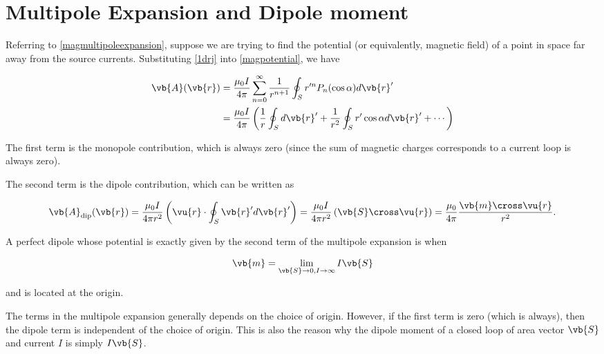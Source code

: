 \documentclass[english,a4paper,12pt]{report}
\begin{document}
\section{Multipole Expansion and Dipole moment}

Referring to \cref{magmultipoleexpansion}, suppose we are trying to find the potential (or equivalently, magnetic field) of a point in space far away from the source currents. Substituting \cref{1drj} into \cref{magpotential}, we have 


\begin{equation}
    \begin{aligned} 
    \vb{A} (\vb{r} ) &= \frac{\mu_0I}{4\pi}  \sum_{n=0}^{\infty} \frac{1}{r^{n+1} } \oint_{S} r'^{n} P_{n}(\cos \alpha )d\vb{r} ' \\
    &= \frac{\mu_0I}{4\pi}  \left( \frac{1}{r} \oint_{S}  d\vb{r}' + \frac{1}{r^2}\oint_{S}  r'\cos \alpha d\vb{r}' + \cdots  \right) 
    \end{aligned} 
\end{equation}

The first term is the monopole contribution, which is always zero (since the sum of magnetic charges corresponds to a current loop is always zero).

The second term is the dipole contribution, which can be written as 

\begin{equation}
    \vb{A} _{\text{dip} } (\vb{r} ) = \frac{\mu_0I}{4\pi r^2}  \left( \vu{r}  \cdot \oint_{S} \vb{r} ' d\vb{r}'  \right) = \frac{\mu_0I}{4\pi r^2} \left( \vb{S} \cross \vu{r} \right) = \frac{\mu_0}{4\pi} \frac{\vb{m} \cross  \vu{r} }{r^2 }.    \label{magdippotential} 
\end{equation}

A perfect dipole whose potential is exactly given by the second term of the multipole expansion is when 

\begin{equation}
    \vb{m} = \lim_{\vb{S}  \to 0, I \to \infty} I\vb{S}  
\end{equation}

and is located at the origin. 

The terms in the multipole expansion generally depends on the choice of origin. However, if the first term is zero (which is always), then the dipole term is independent of the choice of origin. This is also the reason why the dipole moment of a closed loop of area vector \(\vb{S} \) and current \(I\) is simply \(I\vb{S} \).    
\end{document}
